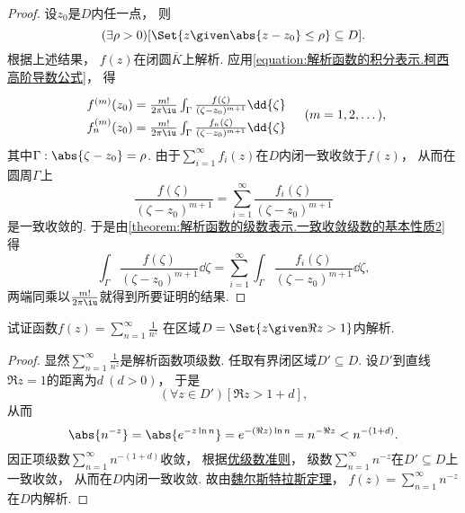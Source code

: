 \begin{theorem}[魏尔斯特拉斯定理]
\begin{proof}
\def\f#1{f\ifx\relax#1\relax\else_{#1}\fi^{(m)}(z_0) = \frac{m!}{2\pi\iu} \int_\Gamma \frac{f\ifx\relax#1\relax\else_{#1}\fi(\zeta)}{(\zeta-z_0)^{m+1}} \dd{\zeta}}
设\(z_0\)是\(D\)内任一点，
则\begin{equation*}
	(\exists \rho > 0)
	[\Set{ z \given \abs{z-z_0} \leq \rho } \subseteq D].
\end{equation*}
根据上述结果，
\(f(z)\)在闭圆\(\overline{K}\)上解析.
应用\cref{equation:解析函数的积分表示.柯西高阶导数公式}，
得\begin{equation*}
	\def\arraystretch{1.5}
	\begin{array}{l}
	\f{} \\
	\f{n}
	\end{array}
	\quad(m=1,2,\dotsc),
\end{equation*}
其中\(\Gamma: \abs{\zeta-z_0}=\rho\).
由于\(\sum_{i=1}^\infty f_i(z)\)在\(D\)内闭一致收敛于\(f(z)\)，
从而在圆周\(\Gamma\)上\begin{equation*}
	\frac{f(\zeta)}{(\zeta-z_0)^{m+1}}
	= \sum_{i=1}^\infty \frac{f_i(\zeta)}{(\zeta-z_0)^{m+1}}
\end{equation*}是一致收敛的.
于是由\cref{theorem:解析函数的级数表示.一致收敛级数的基本性质2} 得\begin{equation*}
	\int_\Gamma \frac{f(\zeta)}{(\zeta-z_0)^{m+1}} \dd{\zeta}
	= \sum_{i=1}^\infty \int_\Gamma \frac{f_i(\zeta)}{(\zeta-z_0)^{m+1}} \dd{\zeta},
\end{equation*}
两端同乘以\(\frac{m!}{2\pi\iu}\)就得到所要证明的结果.
\end{proof}
\end{theorem}

\begin{example}
试证函数\(f(z) = \sum_{n=1}^\infty \frac{1}{n^z}\)
在区域\(D = \Set{ z \given \Re z > 1 }\)内解析.
\begin{proof}
显然\(\sum_{n=1}^\infty \frac{1}{n^z}\)是解析函数项级数.
任取有界闭区域\(D' \subseteq D\).
设\(D'\)到直线\(\Re z = 1\)的距离为\(d\ (d > 0)\)，
于是\begin{equation*}
	(\forall z \in D')
	[\Re z > 1+d],
\end{equation*}
从而\begin{equation*}
	\abs{n^{-z}} = \abs{e^{-z \ln n}}
	= e^{-(\Re z) \ln n} = n^{-\Re z}
	< n^{-(1+d)}.
\end{equation*}
因正项级数\(\sum_{n=1}^\infty n^{-(1+d)}\)收敛，
根据\hyperref[theorem:无穷级数.优级数准则]{优级数准则}，
级数\(\sum_{n=1}^\infty n^{-z}\)在\(D' \subseteq D\)上一致收敛，
从而在\(D\)内闭一致收敛.
故由\hyperref[theorem:解析函数的级数表示.魏尔斯特拉斯定理]{魏尔斯特拉斯定理}，
\(f(z) = \sum_{n=1}^\infty n^{-z}\)在\(D\)内解析.
\end{proof}
\end{example}
